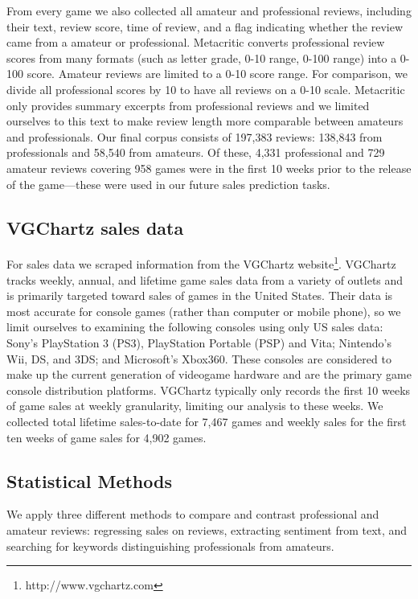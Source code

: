 \documentclass[letterpaper]{article}
\begin{document}
From every game we also collected all amateur and professional reviews,
including their text, review score, time of review, and a flag
indicating whether the review came from a amateur or professional.
Metacritic converts professional review scores from many formats (such
as letter grade, 0-10 range, 0-100 range) into a 0-100 score. Amateur
reviews are limited to a 0-10 score range. For comparison, we divide all professional scores by 10 to have all reviews on a 0-10 scale. Metacritic only provides summary excerpts from professional reviews and we limited ourselves to this text to make review length more comparable between amateurs and professionals. Our final corpus consists of 197,383 reviews: 138,843 from professionals and 58,540 from amateurs. Of these, 4,331 professional and 729 amateur reviews covering 958 games were in the first 10 weeks prior to the release of the game---these were used in our future sales prediction tasks.

\subsection{VGChartz sales data}
For sales data we scraped information from the VGChartz website\footnote{http://www.vgchartz.com}. VGChartz tracks weekly, annual, and lifetime game sales data from a variety of outlets and is primarily targeted toward sales of games in the United States. Their data is most accurate for console games (rather than computer or mobile phone), so we limit ourselves to examining the following consoles using only US sales data: Sony's PlayStation 3 (PS3), PlayStation Portable (PSP) and Vita; Nintendo's Wii, DS, and 3DS; and Microsoft's Xbox360. These consoles are considered to make up the current generation of videogame hardware and are the primary game console distribution platforms. VGChartz typically only records the first 10 weeks of game sales at weekly granularity, limiting our analysis to these weeks. We collected total lifetime sales-to-date for 7,467 games and weekly sales for the first ten weeks of game sales for 4,902 games.

\subsection{Statistical Methods}
We apply three different methods to compare and contrast professional
and amateur reviews: regressing sales on reviews, extracting sentiment
from text, and searching for keywords distinguishing professionals from
amateurs.
\end{document}

